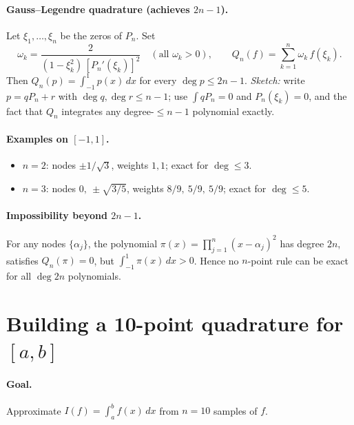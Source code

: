 \documentclass[11pt,a4paper]{article}
\theoremstyle{definition}
\theoremstyle{definition}
\theoremstyle{plain}
\theoremstyle{remark}
\begin{document}
\paragraph{Gauss--Legendre quadrature (achieves \(2n{-}1\)).}
Let \(\xi_1,\dots,\xi_n\) be the zeros of \(P_n\). Set
\[
\omega_k=\frac{2}{(1-\xi_k^2)\,[P_n'(\xi_k)]^2}
\quad(\text{all }\omega_k>0),
\qquad
Q_n(f)=\sum_{k=1}^n \omega_k\,f(\xi_k).
\]
Then \(Q_n(p)=\int_{-1}^{1}p(x)\,dx\) for every \(\deg p\le 2n-1\).
\emph{Sketch:} write \(p=qP_n+r\) with \(\deg q,\deg r\le n-1\); use \(\int qP_n=0\) and \(P_n(\xi_k)=0\), and the fact that \(Q_n\) integrates any degree-\(\le n{-}1\) polynomial exactly.

\paragraph{Examples on \([-1,1]\).}
\begin{itemize}
	\item \(n=2\): nodes \(\pm 1/\sqrt{3}\), weights \(1,1\); exact for \(\deg\le 3\).
	\item \(n=3\): nodes \(0,\ \pm\sqrt{3/5}\), weights \(8/9,\ 5/9,\ 5/9\); exact for \(\deg\le 5\).
\end{itemize}

\paragraph{Impossibility beyond \(2n{-}1\).}
For any nodes \(\{\alpha_j\}\), the polynomial \(\pi(x)=\prod_{j=1}^n(x-\alpha_j)^2\) has degree \(2n\),
satisfies \(Q_n(\pi)=0\), but \(\int_{-1}^{1}\pi(x)\,dx>0\). Hence no \(n\)-point rule can be exact for all \(\deg 2n\) polynomials.

\section*{Building a 10-point quadrature for \([a,b]\)}

\paragraph{Goal.}
Approximate \(\displaystyle I(f)=\int_a^b f(x)\,dx\) from \(n=10\) samples of \(f\).
\end{document}
